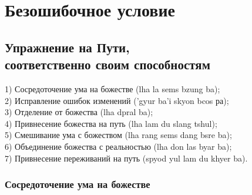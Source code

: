 \section{Безошибочное условие}

\subsection{Упражнение на Пути, \\ соответственно своим способностям}

1)  Сосредоточение ума на божестве (lha la sems bzung ba);\\
2)  Исправление ошибок изменений ('gyur ba'i skyon bcos ра);\\
3)  Отделение от божества (lha dpral ba);\\
4)  Привнесение божества на путь (lha lam du slang tshul);\\
5)  Смешивание ума с божеством (lha rang sems dang bsre ba);\\
6)  Объединение божества с реальностью (lha don las byar ba);\\
7)  Привнесение переживаний на путь (spyod yul lam du khyer ba).\\

\subsubsection{Сосредоточение ума на божестве}


